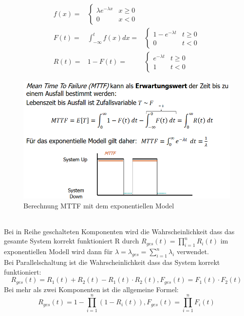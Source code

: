 \documentclass[a4paper,12pt,leqno]{article}
\begin{document}
\begin{align*}
f(x) = &
\begin{cases} 
	\lambda e^{-\lambda x} & x\geq 0\\
	 0 & x < 0
\end{cases} \\
F(t) = & \int_{-\infty}^t f(x)dx = &
\begin{cases}
1 -e^{-\lambda t} & t \geq 0\\
0 & t < 0
\end{cases}\\
R(t) = & 1 -F(t) = & 
\begin{cases}
e^{-\lambda t} & t \geq 0\\
1 & t< 0
\end{cases}
\end{align*}
\begin{figure}[h!]
\centering
\includegraphics[scale=0.6]{Grafiken/MTTF-Model.png}
\caption{Berechnung MTTF mit dem exponentiellen Model}
\end{figure}\\
Bei in Reihe geschalteten Komponenten wird die Wahrscheinlichkeit dass das gesamte System korrekt funktioniert R durch $R_{ges}(t)=\prod^n_{i=1}R_i(t)$ im exponentiellen Modell wird dann für $\lambda = \lambda_{ges}=\sum_{i=1}^n\lambda_i$ verwendet.\\
Bei Parallelschaltung ist die Wahrscheinlichkeit dass das System korrekt funktioniert:
$$R_{ges}(t)=R_1(t)+R_2(t)-R_1(t)\cdot R_2(t), F_{ges}(t)=F_1(t)\cdot F_2(t)$$
Bei mehr als zwei Komponenten ist die allgemeine Formel:
$$R_{ges}(t)=1-\prod_{i=1}^n(1-R_i(t)), F_{ges}(t)=\prod_{i=1}^nF_i(t)$$
\end{document}
